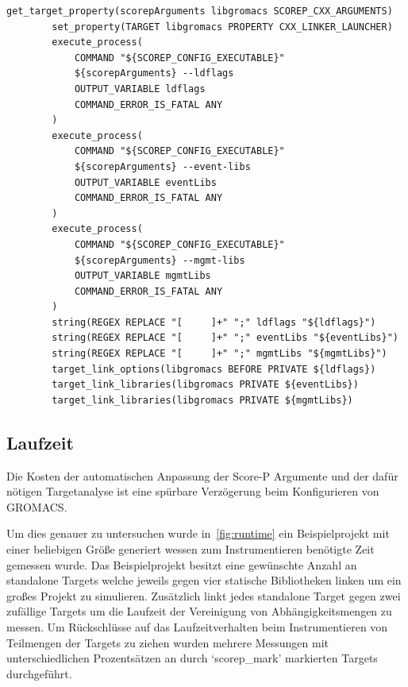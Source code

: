 \documentclass[german,proseminar,hyperref,utf8]{zihpub}
\begin{document}
    \begin{lstlisting}[caption=Workaround für Score-P Bug, gobble=8, label=lst:workaround]
        get_target_property(scorepArguments libgromacs SCOREP_CXX_ARGUMENTS)
        set_property(TARGET libgromacs PROPERTY CXX_LINKER_LAUNCHER)
        execute_process(
            COMMAND "${SCOREP_CONFIG_EXECUTABLE}"
            ${scorepArguments} --ldflags
            OUTPUT_VARIABLE ldflags
            COMMAND_ERROR_IS_FATAL ANY
        )
        execute_process(
            COMMAND "${SCOREP_CONFIG_EXECUTABLE}"
            ${scorepArguments} --event-libs
            OUTPUT_VARIABLE eventLibs
            COMMAND_ERROR_IS_FATAL ANY
        )
        execute_process(
            COMMAND "${SCOREP_CONFIG_EXECUTABLE}"
            ${scorepArguments} --mgmt-libs
            OUTPUT_VARIABLE mgmtLibs
            COMMAND_ERROR_IS_FATAL ANY
        )
        string(REGEX REPLACE "[     ]+" ";" ldflags "${ldflags}")
        string(REGEX REPLACE "[     ]+" ";" eventLibs "${eventLibs}")
        string(REGEX REPLACE "[     ]+" ";" mgmtLibs "${mgmtLibs}")
        target_link_options(libgromacs BEFORE PRIVATE ${ldflags})
        target_link_libraries(libgromacs PRIVATE ${eventLibs})
        target_link_libraries(libgromacs PRIVATE ${mgmtLibs})
    \end{lstlisting}

    \subsection{Laufzeit}
    Die Kosten der automatischen Anpassung der Score-P Argumente und der dafür nötigen Targetanalyse
    ist eine spürbare Verzögerung beim Konfigurieren von GROMACS.

    Um dies genauer zu untersuchen wurde in~\ref{fig:runtime} ein Beispielprojekt mit einer beliebigen
    Grö{\ss}e generiert wessen zum Instrumentieren benötigte Zeit gemessen wurde.
    Das Beispielprojekt besitzt eine gewünschte Anzahl an standalone Targets welche jeweils gegen vier
    statische Bibliotheken linken um ein gro{\ss}es Projekt zu simulieren.
    Zusätzlich linkt jedes standalone Target gegen zwei zufällige Targets um die Laufzeit der
    Vereinigung von Abhängigkeitsmengen zu messen.
    Um Rückschlüsse auf das Laufzeitverhalten beim Instrumentieren von Teilmengen der Targets
    zu ziehen wurden mehrere Messungen mit unterschiedlichen Prozentsätzen an durch `scorep\_mark'
    markierten Targets durchgeführt.
\end{document}
